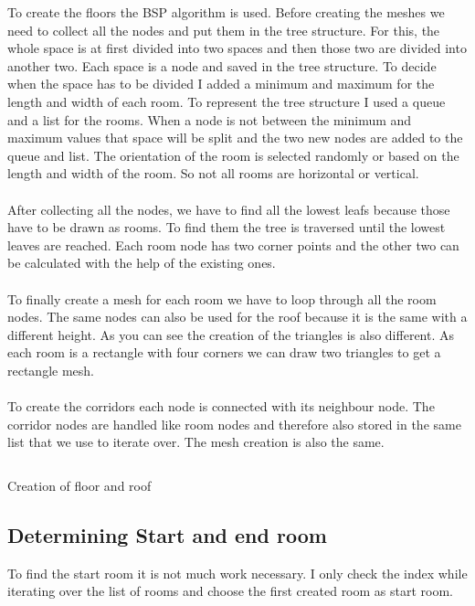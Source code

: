\documentclass[a4paper,11pt,oneside]{scrreprt}
\begin{document}
To create the floors the BSP algorithm is used. Before creating the meshes we need to collect all the nodes and put them in the tree structure. For this, the whole space is at first divided into two spaces and then those two are divided into another two. Each space is a node and saved in the tree structure. To decide when the space has to be divided I added a minimum and maximum for the length and width of each room. To represent the tree structure I used a queue and a list for the rooms. When a node is not between the minimum and maximum values that space will be split and the two new nodes are added to the queue and list. The orientation of the room is selected randomly or based on the length and width of the room. So not all rooms are horizontal or vertical.
\\
\\
After collecting all the nodes, we have to find all the lowest leafs because those have to be drawn as rooms. To find them the tree is traversed until the lowest leaves are reached. Each room node has two corner points and the other two can be calculated with the help of the existing ones. 
\\
\\
To finally create a mesh for each room we have to loop through all the room nodes. The same nodes can also be used for the roof because it is the same with a different height. As you can see the creation of the triangles is also different. As each room is a rectangle with four corners we can draw two triangles to get a rectangle mesh.
\\
\\
To create the corridors each node is connected with its neighbour node. The corridor nodes are handled like room nodes and therefore also stored in the same list that we use to iterate over. The mesh creation is also the same.
\\
\begin{listing}[ht]
    \inputminted[fontsize=\footnotesize,linenos]{csharp}{code/CreateFloorRoof.cs}
    \caption[Creation of floor and roof]{Creation of floor and roof}
    \label{code:creation-of-floor-and-roof}
\end{listing}

\newpage
\subsection{Determining Start and end room}
\label{subsection:determining-start-and-end-room}
To find the start room it is not much work necessary. I only check the index while iterating over the list of rooms and choose the first created room as start room. 
\end{document}
